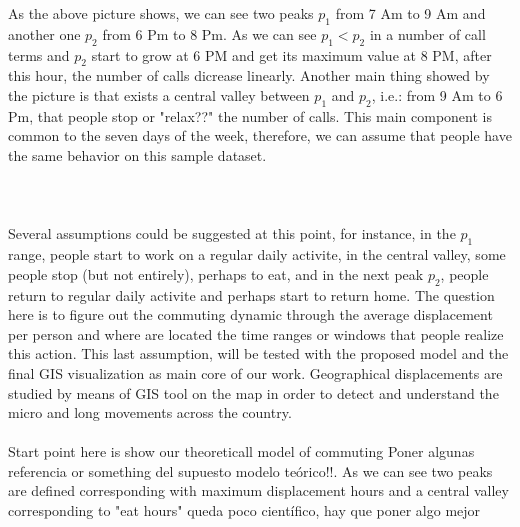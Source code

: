 As the above picture shows, we can see two peaks $p_1$ from 7 Am to 9 Am and another one $p_2$ from 6 Pm to 8 Pm. As we can see $p_1 < p_2$ in a number of call terms and $p_2$ start to grow at 6 PM and get its maximum value at 8 PM, after this hour, the number of calls dicrease linearly. Another main thing showed by the picture is that exists a central valley between $p_1$ and $p_2$, i.e.:  from 9 Am to 6 Pm, that people stop or "relax??" the number of calls. 
This main component is common to the seven days of the week, therefore, we can assume that people have the same behavior on this sample dataset.
\\
\\
\\
\\
Several assumptions could be suggested at this point, for instance, in the $p_1$ range, people start to work on a regular daily activite, in the central valley, some people stop (but not entirely), perhaps to eat, and in the next peak $p_2$, people return to regular daily activite and perhaps start to return home.
The question here is to figure out the commuting dynamic through the average displacement per person and where are located the time ranges or windows that people realize this action.  This last assumption, will be tested with the proposed model and the final GIS visualization as main core of our work.  Geographical displacements are studied by means of GIS tool on the map in order to detect and understand the micro and long movements across the country. 
\\
\\
Start point here is show our theoreticall model of commuting {\color{red} Poner algunas referencia or something del supuesto modelo teórico!!}. As we can see two peaks are defined corresponding with maximum displacement hours and a central valley corresponding to "eat hours"  {\color{red} queda poco científico, hay que poner algo mejor}

\newpage

